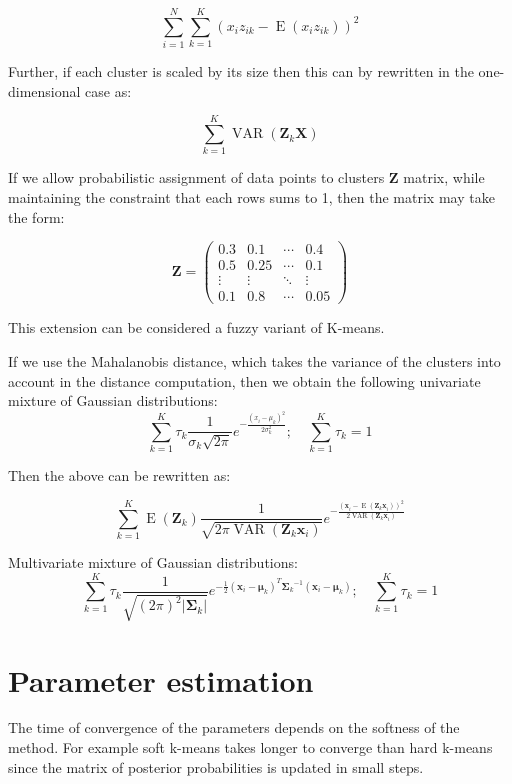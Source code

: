 \[
  \sum_{i=1}^N \sum_{k=1}^{K} ( x_i z_{ik} - \operatorname{E}(x_i z_{ik}) )^2 
\]

Further, if each cluster is scaled by its size then this can by rewritten in the one-dimensional case as:


\[
  \sum_{k=1}^{K} \operatorname{VAR}(\mathbf Z_k \mathbf X)
\]


If we allow probabilistic assignment of data points to clusters $\mathbf Z$ matrix, while maintaining the constraint that each rows sums to 1,
then the matrix may take the form:


\[
\mathbf Z =
 \begin{pmatrix}
  0.3 & 0.1 & \cdots & 0.4 \\
  0.5 & 0.25 & \cdots & 0.1 \\
  \vdots  & \vdots  & \ddots & \vdots  \\
  0.1 & 0.8 & \cdots & 0.05
 \end{pmatrix}
\]

This extension can be considered a fuzzy variant of K-means.

If we use the Mahalanobis distance, which 
takes the variance of the clusters into account in the distance computation,
then we obtain the following univariate mixture of Gaussian distributions:
\[
\sum_{k=1}^K\tau_k \frac{1}{\sigma_k\sqrt{2\pi}} e^{ -\frac{(x_i-\mu_k)^2}{2\sigma_k^2} }; \quad \sum_{k=1}^K\tau_k = 1
\]



Then the above can be rewritten as:


\[
  \sum_{k=1}^K \operatorname{E}(\mathbf Z_k) \frac{1}{\sqrt{2\pi \operatorname{VAR} (\mathbf Z_k \mathbf x_i)} } e^{ -\frac{(\mathbf x_i- \operatorname{E}(\mathbf Z_k \mathbf x_i))^2}{2\operatorname{VAR}(\mathbf Z_k \mathbf x_i)} }
\]



Multivariate mixture of Gaussian distributions:
\[
\sum_{k=1}^K\tau_k \frac{1}{\sqrt{(2\pi)^2|\boldsymbol\Sigma_k|}}
e^{-\frac{1}{2}({\mathbf x_i}-{\boldsymbol\mu_k})^T{\boldsymbol\Sigma_k}^{-1}({\mathbf x_i}-{\boldsymbol\mu_k})
}; \quad \sum_{k=1}^K\tau_k = 1
\]

\section{Parameter estimation} 

The time of convergence of the parameters depends on the softness of the method.
For example soft k-means takes longer to converge than hard k-means since the matrix of posterior probabilities is updated in small steps.

